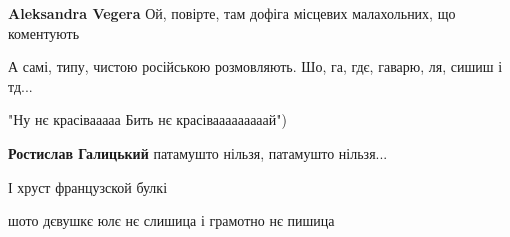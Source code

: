 \begin{itemize}
\begin{itemize}
 
\textbf{Aleksandra Vegera} Ой, повірте, там дофіга місцевих малахольних, що коментують
\end{itemize}

 
А самі, типу, чистою російською розмовляють. Шо, га, гдє, гаварю, ля, сишиш і тд...

 
"Ну нє красівааааа
Бить нє красівааааааааай")

\begin{itemize}
 
\textbf{Ростислав Галицький} патамушто нільзя, патамушто нільзя...

 
І хруст французской булкі
\end{itemize}

 

шото дєвушкє юлє нє слишица і грамотно нє пишица


\end{itemize}
